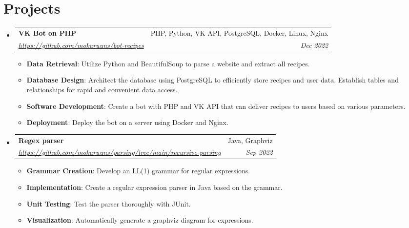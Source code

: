 \documentclass[letterpaper,10.8pt]{article}
\makeatletter
\newcommand{\resumeItem}[2]{
    \item\small{
        \textbf{#1}{: #2 \vspace{-2pt}}
    }
}
\newcommand{\resumeSubheading}[4]{
    \vspace{-1pt}\item
    \begin{tabular*}{0.97\textwidth}{l@{\extracolsep{\fill}}r}
        \textbf{#1}       & #2                 \\
        \textit{\small#3} & \textit{\small #4} \\
    \end{tabular*}\vspace{-5pt}
}
\newcommand{\resumeSubHeadingListStart}{\begin{itemize}[leftmargin=*]}
\newcommand{\resumeSubHeadingListEnd}{\end{itemize}}
\newcommand{\resumeItemListStart}{\begin{itemize}}
\newcommand{\resumeItemListEnd}{\end{itemize}\vspace{-5pt}}
\makeatother
\begin{document}
\section{Projects}
\resumeSubHeadingListStart
\resumeSubheading
{VK Bot on PHP} {PHP, Python, VK API, PostgreSQL, Docker, Linux, Nginx}
{\href{https://github.com/mokaruuns/bot-recipes}{https://github.com/mokaruuns/bot-recipes}}{Dec 2022}
\resumeItemListStart
\resumeItem{Data Retrieval}{Utilize Python and BeautifulSoup to parse a website and extract all recipes.}
\resumeItem{Database Design}{Architect the database using PostgreSQL to efficiently store recipes and user data. Establish tables and relationships for rapid and convenient data access.}
\resumeItem{Software Development}{Create a bot with PHP and VK API that can deliver recipes to users based on various parameters.}
\resumeItem{Deployment}{Deploy the bot on a server using Docker and Nginx.}
\resumeItemListEnd

\resumeSubheading
{Regex parser} {Java, Graphviz}
{\href{https://github.com/mokaruuns/parsing/tree/main/recursive-parsing}{https://github.com/mokaruuns/parsing/tree/main/recursive-parsing}}{Sep 2022}
\resumeItemListStart
\resumeItem{Grammar Creation}{Develop an LL(1) grammar for regular expressions.}
\resumeItem{Implementation}{Create a regular expression parser in Java based on the grammar.}
\resumeItem{Unit Testing}{Test the parser thoroughly with JUnit.}
\resumeItem{Visualization}{Automatically generate a graphviz diagram for expressions.}
\resumeItemListEnd

\resumeSubHeadingListEnd
\end{document}
